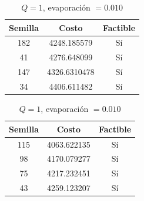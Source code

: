 \documentclass{article}
\begin{document}
    \begin{table}[H]
      \begin{minipage}{0.5\linewidth}
        \centering
        \caption{$Q=100$, evaporación $= 0.2$}
        \begin{tabular}{c c c}
          \hline
          Semilla & Costo & Factible   \\
          \hline
          182     & 4248.185579  & Sí  \\
          41      & 4276.648099  & Sí  \\
          147     & 4326.6310478 & Sí  \\
          34      & 4406.611482  & Sí  \\
        \end{tabular}
      \end{minipage}
      \begin{minipage}{0.5\linewidth}
        \centering
        \caption{$Q=1$, evaporación $= 0.010$}
        \begin{tabular}{c c c}
          \hline
          Semilla & Costo & Factible \\
          \hline
          115     & 4063.622135 & Sí \\
          98      & 4170.079277 & Sí \\
          75      & 4217.232451 & Sí \\
          43      & 4259.123207 & Sí \\
        \end{tabular}
      \end{minipage}
    \end{table}
\end{document}
